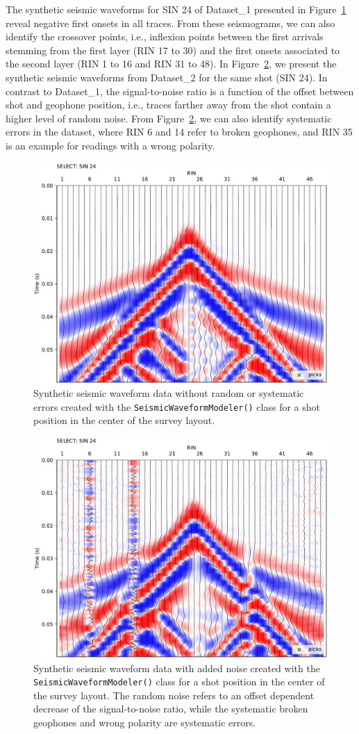 \documentclass[a4paper,fleqn]{cas-sc}
\begin{document}
The synthetic seismic waveforms for SIN 24 of Dataset\_1 presented in Figure~\ref{fig:syndata_clean} reveal negative first onsets in all traces. From these seismograms, we can also identify the crossover points, i.e., inflexion points between the first arrivals stemming from the first layer (RIN 17 to 30) and the first onsets associated to the second layer (RIN 1 to 16 and RIN 31 to 48). In Figure~\ref{fig:syndata_noise}, we present the synthetic seismic waveforms from Dataset\_2 for the same shot (SIN 24). In contrast to Dataset\_1, the signal-to-noise ratio is a function of the offset between shot and geophone position, i.e., traces farther away from the shot contain a higher level of random noise. 
From Figure~\ref{fig:syndata_noise}, we can also identify systematic errors in the dataset, where RIN 6 and 14 refer to broken geophones, and RIN 35 is an example for readings with a wrong polarity.
\begin{figure}
	\centering
	\includegraphics[width=.75\textwidth]{figures/syn_clean_sin24.pdf}
	\caption{Synthetic seismic waveform data without random or systematic errors created with the \texttt{SeismicWaveformModeler()} class for a shot position in the center of the survey layout.}
	\label{fig:syndata_clean}
\end{figure}

\begin{figure}
	\centering
	\includegraphics[width=.75\textwidth]{figures/syn_noise_sin24.pdf}
	\caption{Synthetic seismic waveform data with added noise created with the \texttt{SeismicWaveformModeler()} class for a shot position in the center of the survey layout. The random noise refers to an offset dependent decrease of the signal-to-noise ratio, while the systematic broken geophones and wrong polarity are systematic errors.}
	\label{fig:syndata_noise}
\end{figure}
\end{document}
